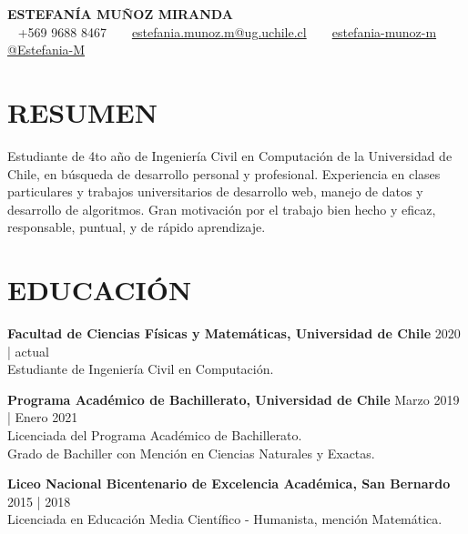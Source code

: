 \documentclass[a4paper, 10pt]{extarticle}
\begin{document}
\pagestyle{empty}

\begin{center}
\textbf{\LARGE ESTEFANÍA MUÑOZ MIRANDA}\\[5pt] %
\faPhone ~ +569 9688 8467 ~
\faEnvelope  ~
\href{mailto:estefania.munoz.m@ug.uchile.cl}{estefania.munoz.m@ug.uchile.cl}  ~
\faLinkedin  ~
\href{https://www.linkedin.com/in/estefania-munoz-m/}{estefania-munoz-m} ~
\faGithub  ~
\href{https://github.com/Estefania-M}{@Estefania-M} ~
\end{center}

\section*{RESUMEN}
Estudiante de 4to año de Ingeniería Civil en Computación de la Universidad de Chile, en búsqueda de desarrollo personal y profesional. Experiencia en clases particulares y trabajos universitarios de desarrollo web, manejo de datos y desarrollo de algoritmos. Gran motivación por el trabajo bien hecho y eficaz, responsable, puntual, y de rápido aprendizaje.

\section*{EDUCACIÓN}
\noindent
\textbf{Facultad de Ciencias Físicas y Matemáticas, Universidad de Chile} \hfill 2020 | actual\\ %
Estudiante de Ingeniería Civil en Computación. 

\noindent
\textbf{Programa Académico de Bachillerato, Universidad de Chile} \hfill Marzo 2019 | Enero 2021\\ %
Licenciada del Programa Académico de Bachillerato.\\
Grado de Bachiller con Mención en Ciencias Naturales y Exactas.

\noindent
\textbf{Liceo Nacional Bicentenario de Excelencia Académica, San Bernardo} \hfill 2015 | 2018\\ %
Licenciada en Educación Media Científico - Humanista, mención Matemática.

\end{document}
